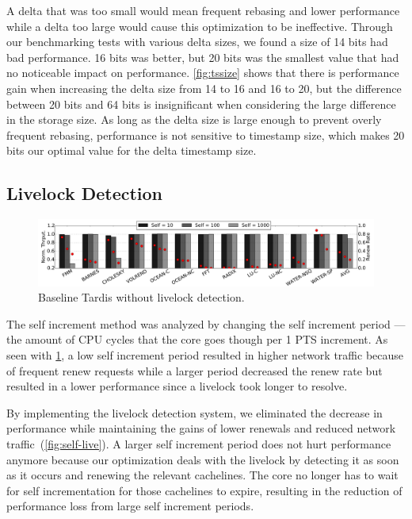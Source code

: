 \documentclass[12pt]{article}
\begin{document}
	A delta that was too small would mean frequent rebasing and lower 
	performance while a delta too large would cause this optimization to 
	be ineffective. Through our benchmarking tests with various delta 
	sizes, we found a size of 14 bits had bad performance. 16 bits was 
	better, but 20 bits was the smallest 
	value that had no noticeable impact on performance. \cref{fig:tssize} shows 
	that  there is performance gain when increasing the delta 
	size from 14 to 16 and 16 to 20, but the difference between 20 bits and 64 
	bits is insignificant when considering the large difference in the 
	storage size. As long as the delta size is large enough to prevent 
	overly frequent rebasing, performance is not sensitive to timestamp 
	size, which makes 20 bits our optimal value for the delta timestamp 
	size.
	
	\subsection{Livelock Detection}
	
	\begin{figure}
		\centering
		\includegraphics[width=0.95\columnwidth]{figs/selfincr_nolive.pdf}
		\caption{ Baseline Tardis without livelock detection. }
		\label{fig:self-nolive}
	\end{figure}
	
	The self increment method was analyzed by changing the self increment 
	period --- the amount of CPU cycles that the core goes though 
	per 1 PTS increment. As seen with \cref{fig:self-nolive}, a low self 
	increment period resulted in higher network traffic because of 
	frequent renew requests while a larger period decreased the renew rate 
	but resulted in a lower performance since a livelock took longer to 
	resolve.  
	
	
	By implementing the livelock detection system, we eliminated the 
	decrease in performance while maintaining the gains of lower renewals 
	and reduced network traffic~(\cref{fig:self-live}).  A larger self 
	increment period does not hurt performance anymore because our 
	optimization deals with the livelock  by detecting 
	it as soon as it occurs and renewing the relevant cachelines. The core no longer has to 
	wait for self incrementation for those cachelines to expire, resulting in the reduction of performance loss from large self increment 
	periods.
	
\end{document}
